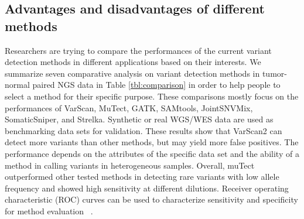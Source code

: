 \documentclass[11pt,reqno]{amsart}
\begin{document}
\subsection{Advantages and disadvantages of different methods}
Researchers are trying to compare the performances of the current variant detection methods in different applications based on their interests.
We summarize seven comparative analysis on variant detection methods in tumor-normal paired NGS data in Table \ref{tbl:comparison} in order to help people to select a method for their specific purpose.
These comparisons mostly focus on the performances of VarScan, MuTect, GATK, SAMtools, JointSNVMix, SomaticSniper, and Strelka.
Synthetic or real WGS/WES data are used as benchmarking data sets for validation.
These results show that VarScan2 can detect more variants than other methods, but may yield more false positives.
The performance depends on the attributes of the specific data set and the ability of a method in calling variants in heterogeneous samples.
Overall, muTect outperformed other tested methods in detecting rare variants with low allele frequency and showed high sensitivity at different dilutions.
Receiver operating characteristic (ROC) curves can be used to characterize sensitivity and specificity for method evaluation ~\citep{Xu2014, Huang2015}.
\end{document}
